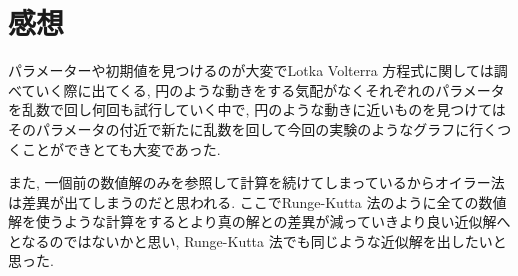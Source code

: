 \documentclass[12pt,a4paper]{jsarticle}
\begin{document}
\section{感想}
パラメーターや初期値を見つけるのが大変でLotka Volterra 方程式に関しては調べていく際に出てくる, 円のような動きをする気配がなくそれぞれのパラメータを乱数で回し何回も試行していく中で, 円のような動きに近いものを見つけてはそのパラメータの付近で新たに乱数を回して今回の実験のようなグラフに行くつくことができとても大変であった.

また, 一個前の数値解のみを参照して計算を続けてしまっているからオイラー法は差異が出てしまうのだと思われる. ここでRunge-Kutta 法のように全ての数値解を使うような計算をするとより真の解との差異が減っていきより良い近似解へとなるのではないかと思い, Runge-Kutta 法でも同じような近似解を出したいと思った.
\end{document}
